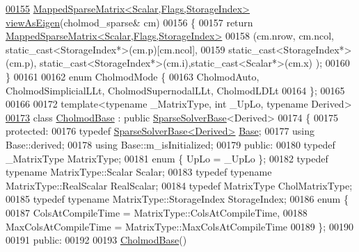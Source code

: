 \begin{DoxyCode}
\hyperlink{namespace_eigen_af13cf1742b9a7a03703e8e5393bb6f86}{00155} \hyperlink{class_eigen_1_1_mapped_sparse_matrix}{MappedSparseMatrix<Scalar,Flags,StorageIndex>} 
      \hyperlink{namespace_eigen_af13cf1742b9a7a03703e8e5393bb6f86}{viewAsEigen}(cholmod\_sparse& cm)
00156 \{
00157   \textcolor{keywordflow}{return} \hyperlink{class_eigen_1_1_mapped_sparse_matrix}{MappedSparseMatrix<Scalar,Flags,StorageIndex>}
00158          (cm.nrow, cm.ncol, \textcolor{keyword}{static\_cast<}StorageIndex*\textcolor{keyword}{>}(cm.p)[cm.ncol],
00159           static\_cast<StorageIndex*>(cm.p), \textcolor{keyword}{static\_cast<}StorageIndex*\textcolor{keyword}{>}(cm.i),static\_cast<Scalar*>(cm.x) );
00160 \}
00161 
00162 \textcolor{keyword}{enum} CholmodMode \{
00163   CholmodAuto, CholmodSimplicialLLt, CholmodSupernodalLLt, CholmodLDLt
00164 \};
00165 
00166 
00172 \textcolor{keyword}{template}<\textcolor{keyword}{typename} \_MatrixType, \textcolor{keywordtype}{int} \_UpLo, \textcolor{keyword}{typename} Derived>
\hyperlink{class_eigen_1_1_cholmod_base}{00173} \textcolor{keyword}{class }\hyperlink{class_eigen_1_1_cholmod_base}{CholmodBase} : \textcolor{keyword}{public} \hyperlink{group___sparse_core___module_class_eigen_1_1_sparse_solver_base}{SparseSolverBase}<Derived>
00174 \{
00175   \textcolor{keyword}{protected}:
00176     \textcolor{keyword}{typedef} \hyperlink{group___sparse_core___module_class_eigen_1_1_sparse_solver_base}{SparseSolverBase<Derived>} \hyperlink{group___sparse_core___module_class_eigen_1_1_sparse_solver_base}{Base};
00177     \textcolor{keyword}{using} Base::derived;
00178     \textcolor{keyword}{using} Base::m\_isInitialized;
00179   \textcolor{keyword}{public}:
00180     \textcolor{keyword}{typedef} \_MatrixType MatrixType;
00181     \textcolor{keyword}{enum} \{ UpLo = \_UpLo \};
00182     \textcolor{keyword}{typedef} \textcolor{keyword}{typename} MatrixType::Scalar Scalar;
00183     \textcolor{keyword}{typedef} \textcolor{keyword}{typename} MatrixType::RealScalar RealScalar;
00184     \textcolor{keyword}{typedef} MatrixType CholMatrixType;
00185     \textcolor{keyword}{typedef} \textcolor{keyword}{typename} MatrixType::StorageIndex StorageIndex;
00186     \textcolor{keyword}{enum} \{
00187       ColsAtCompileTime = MatrixType::ColsAtCompileTime,
00188       MaxColsAtCompileTime = MatrixType::MaxColsAtCompileTime
00189     \};
00190 
00191   \textcolor{keyword}{public}:
00192 
00193     \hyperlink{class_eigen_1_1_cholmod_base}{CholmodBase}()

\end{DoxyCode}
